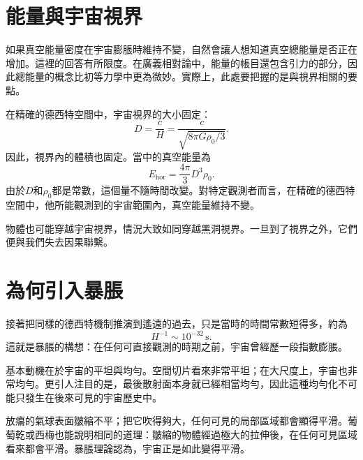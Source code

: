 \section{能量與宇宙視界}

如果真空能量密度在宇宙膨脹時維持不變，自然會讓人想知道真空總能量是否正在增加。這裡的回答有所限度。在廣義相對論中，能量的帳目還包含引力的部分，因此總能量的概念比初等力學中更為微妙。實際上，此處要把握的是與視界相關的要點。

在精確的德西特空間中，宇宙視界的大小固定：
\begin{equation}
D=\frac{c}{H}
=\frac{c}{\sqrt{8\pi G\rho_0/3}}.
\end{equation}
因此，視界內的體積也固定。當中的真空能量為
\begin{equation}
E_{\mathrm{hor}}=\frac{4\pi}{3}D^3\rho_0.
\end{equation}
由於\(D\)和\(\rho_0\)都是常數，這個量不隨時間改變。對特定觀測者而言，在精確的德西特空間中，他所能觀測到的宇宙範圍內，真空能量維持不變。

物體也可能穿越宇宙視界，情況大致如同穿越黑洞視界。一旦到了視界之外，它們便與我們失去因果聯繫。

\begin{classroomqa}
\end{classroomqa}

\section{為何引入暴脹}

接著把同樣的德西特機制推演到遙遠的過去，只是當時的時間常數短得多，約為
\begin{equation}
H^{-1}\sim 10^{-32}\,\mathrm{s}.
\end{equation}
這就是暴脹的構想：在任何可直接觀測的時期之前，宇宙曾經歷一段指數膨脹。

基本動機在於宇宙的平坦與均勻。空間切片看來非常平坦；在大尺度上，宇宙也非常均勻。更引人注目的是，最後散射面本身就已經相當均勻，因此這種均勻化不可能只發生在後來可見的宇宙歷史中。

放癟的氣球表面皺縮不平；把它吹得夠大，任何可見的局部區域都會顯得平滑。葡萄乾或西梅也能說明相同的道理：皺縮的物體經過極大的拉伸後，在任何可見區域看來都會平滑。暴脹理論認為，宇宙正是如此變得平滑。


